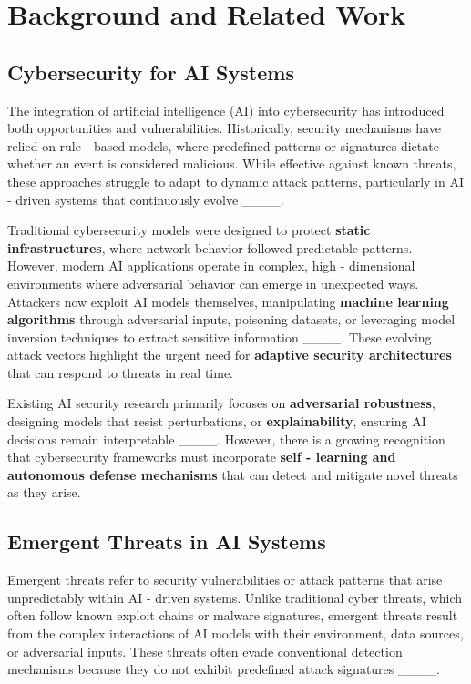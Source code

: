 \section{Background and Related Work}
\subsection{Cybersecurity for AI Systems}
The integration of artificial intelligence (AI) into cybersecurity has introduced both opportunities and vulnerabilities. Historically, security mechanisms have relied on rule - based models, where predefined patterns or signatures dictate whether an event is considered malicious. While effective against known threats, these approaches struggle to adapt to dynamic attack patterns, particularly in AI - driven systems that continuously evolve ____.

Traditional cybersecurity models were designed to protect \textbf{static infrastructures}, where network behavior followed predictable patterns. However, modern AI applications operate in complex, high - dimensional environments where adversarial behavior can emerge in unexpected ways. Attackers now exploit AI models themselves, manipulating \textbf{machine learning algorithms} through adversarial inputs, poisoning datasets, or leveraging model inversion techniques to extract sensitive information ____. These evolving attack vectors highlight the urgent need for \textbf{adaptive security architectures} that can respond to threats in real time.

Existing AI security research primarily focuses on \textbf{adversarial robustness}, designing models that resist perturbations, or \textbf{explainability}, ensuring AI decisions remain interpretable ____. However, there is a growing recognition that cybersecurity frameworks must incorporate \textbf{self - learning and autonomous defense mechanisms} that can detect and mitigate novel threats as they arise.

\subsection{Emergent Threats in AI Systems}
Emergent threats refer to security vulnerabilities or attack patterns that arise unpredictably within AI - driven systems. Unlike traditional cyber threats, which often follow known exploit chains or malware signatures, emergent threats result from the complex interactions of AI models with their environment, data sources, or adversarial inputs. These threats often evade conventional detection mechanisms because they do not exhibit predefined attack signatures ____.

